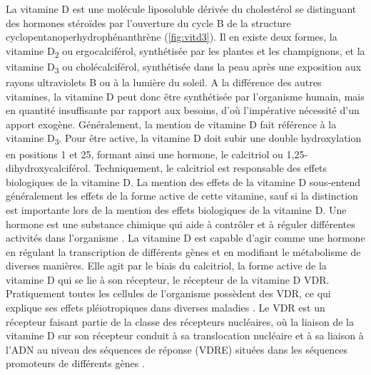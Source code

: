\documentclass[
  a4paper,
  DIV=11,
  numbers=noendperiod,
  listof=totoc]{scrreprt}
\begin{document}
La vitamine D est une molécule liposoluble dérivée du cholestérol se
distinguant des hormones stéroïdes par l'ouverture du cycle B de la
structure cyclopentanoperhydrophénanthrène \autocite{Norman.2008}
(\cref{fig:vitd3}). Il en existe deux formes, la vitamine
D\textsubscript{2} ou ergocalciférol, synthétisée par les plantes et les
champignons, et la vitamine D\textsubscript{3} ou cholécalciférol,
synthétisée dans la peau après une exposition aux rayons ultraviolets B
ou à la lumière du soleil. A la différence des autres vitamines, la
vitamine D peut donc être synthétisée par l'organisme humain, mais en
quantité insuffisante par rapport aux besoins, d'où l'impérative
nécessité d'un apport exogène. Généralement, la mention de vitamine D
fait référence à la vitamine D\textsubscript{3}. Pour être active, la
vitamine D doit subir une double hydroxylation en positions 1 et 25,
formant ainsi une hormone, le calcitriol ou 1,25-dihydroxycalciférol.
Techniquement, le calcitriol est responsable des effets biologiques de
la vitamine D. La mention des effets de la vitamine D sous-entend
généralement les effets de la forme active de cette vitamine, sauf si la
distinction est importante lors de la mention des effets biologiques de
la vitamine D. Une hormone est une substance chimique qui aide à
contrôler et à réguler différentes activités dans l'organisme
\autocite{Ellison.2021}. La vitamine D est capable d'agir comme une
hormone en régulant la transcription de différents gènes et en modifiant
le métabolisme de diverses manières. Elle agit par le biais du
calcitriol, la forme active de la vitamine D qui se lie à son récepteur,
le récepteur de la vitamine D \acs{VDR}. Pratiquement toutes les
cellules de l'organisme possèdent des VDR, ce qui explique ses effets
pléiotropiques dans diverses maladies
\autocite{Ellison.2021,Caprio.2017,Norman.2008}. Le \ac{VDR} est un
récepteur faisant partie de la classe des récepteurs nucléaires, où la
liaison de la vitamine D sur son récepteur conduit à sa translocation
nucléaire et à sa liaison à l'ADN au niveau des séquences de réponse
(\acs{VDRE}) situées dans les séquences promoteurs de différents gènes
\autocite{Bouillon.2008}.
\end{document}
